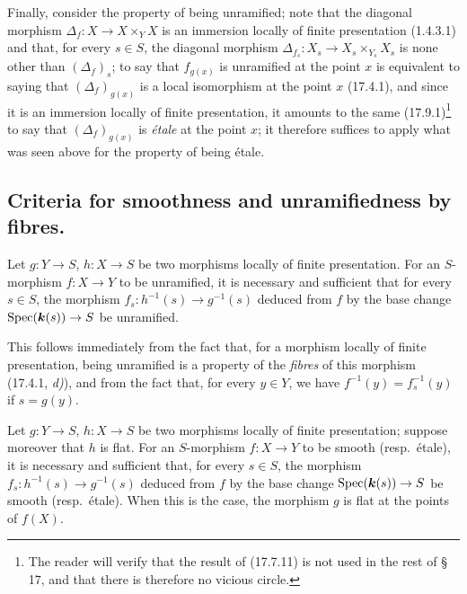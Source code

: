 Finally, consider the property of being unramified; note that the diagonal morphism $\Delta_f:X\to X\times_Y X$ is an immersion locally of finite presentation (1.4.3.1) and that, for every $s\in S$, the diagonal morphism $\Delta_{f_s}:X_s\to X_s\times_{Y_s}X_s$ is none other than $(\Delta_f)_s$; to say that $f_{g(x)}$ is unramified at the point $x$ is equivalent to saying that $(\Delta_f)_{g(x)}$ is a local isomorphism at the point $x$ (17.4.1), and since it is an immersion locally of finite presentation, it amounts to the same (17.9.1)\footnote{The reader will verify that the result of (17.7.11) is not used in the rest of § 17, and that there is therefore no vicious circle.} to say that $(\Delta_f)_{g(x)}$ is \emph{étale} at the point $x$; it therefore suffices to apply what was seen above for the property of being étale.



\subsection{Criteria for smoothness and unramifiedness by fibres.}
\label{IV.17.8}

\begin{proposition}[17.8.1]
\label{IV.17.8.1}
Let $g:Y\to S$, $h:X\to S$ be two morphisms locally of finite presentation. For an $S$-morphism $f:X\to Y$ to be unramified, it is necessary and sufficient that for every $s\in S$, the morphism $f_s:h^{-1}(s)\to g^{-1}(s)$ deduced from $f$ by the base change $\operatorname{Spec}(\boldsymbol{k}(s))\to S$ be unramified.
\end{proposition}

This follows immediately from the fact that, for a morphism locally of finite presentation, being unramified is a property of the \emph{fibres} of this morphism (17.4.1, \emph{d)}), and from the fact that, for every $y\in Y$, we have $f^{-1}(y)=f_s^{-1}(y)$ if $s=g(y)$.

\begin{proposition}[17.8.2]
\label{IV.17.8.2}
Let $g:Y\to S$, $h:X\to S$ be two morphisms locally of finite presentation; suppose moreover that $h$ is \textup{flat}. For an $S$-morphism $f:X\to Y$ to be smooth \textup{(resp.}\ étale\textup{)}, it is necessary and sufficient that, for every $s\in S$, the morphism $f_s:h^{-1}(s)\to g^{-1}(s)$ deduced from $f$ by the base change $\operatorname{Spec}(\boldsymbol{k}(s))\to S$ be smooth \textup{(resp.}\ étale\textup{)}. When this is the case, the morphism $g$ is flat at the points of $f(X)$.
\end{proposition}

